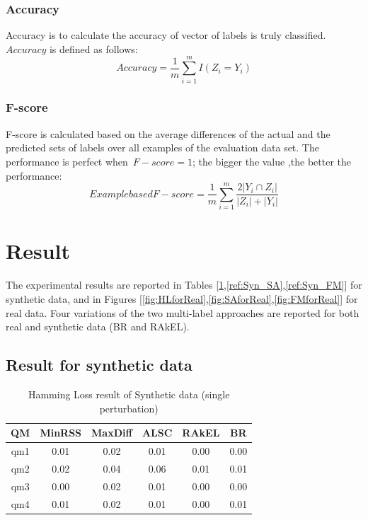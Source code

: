 \documentclass[11pt]{article}
\begin{document}
\subsubsection{Accuracy}
 Accuracy is to calculate the accuracy of vector of labels is truly classified. $ Accuracy$ is defined as follows:
\begin{equation} 
 Accuracy= \frac{1}{m}\sum_{i=1}^{m}  I(Z_i = Y_i)
\end{equation}
\subsubsection{F-score} F-score is calculated based on the average differences of the actual and the predicted sets of labels over all examples of the evaluation data set. The performance is perfect when~$F-score = 1$; the bigger the value ,the better the performance:
\begin{equation} 
 Example based F-score= \frac{1}{m}\sum_{i=1}^{m} \frac{2|Y_i \cap Z_i|}{|Z_i|+|Y_i|}
\end{equation}
\section{Result}

The experimental results are reported in Tables [\ref{ref:Syn_HL},\ref{ref:Syn_SA},\ref{ref:Syn_FM}] for synthetic data, and in  Figures [\ref{fig:HLforReal},\ref{fig:SAforReal},\ref{fig:FMforReal}] for real data. Four variations of the two multi-label approaches are reported for both real and synthetic data (BR and RAkEL).
\subsection{Result for synthetic data}



\begin {table}[h]
\scriptsize
\centering
\begin{tabular}{c|c|c|c|c|c}	
	\hline\hline	
QM & MinRSS & MaxDiff & ALSC & RAkEL & BR   \\ \hline
qm1 & 0.01 & 0.02 & 0.01 & 0.00 & 0.00 \\
qm2 & 0.02 & 0.04 & 0.06 & 0.01 & 0.01  \\
qm3 & 0.00 & 0.02 & 0.01 & 0.00 & 0.00   \\
qm4 & 0.01 & 0.02 & 0.01 & 0.00 & 0.01  \\  \hline\hline
\end{tabular}
\caption {Hamming Loss result of Synthetic data (single perturbation)} \label{ref:Syn_HL} 
\end{table}
\end{document}
